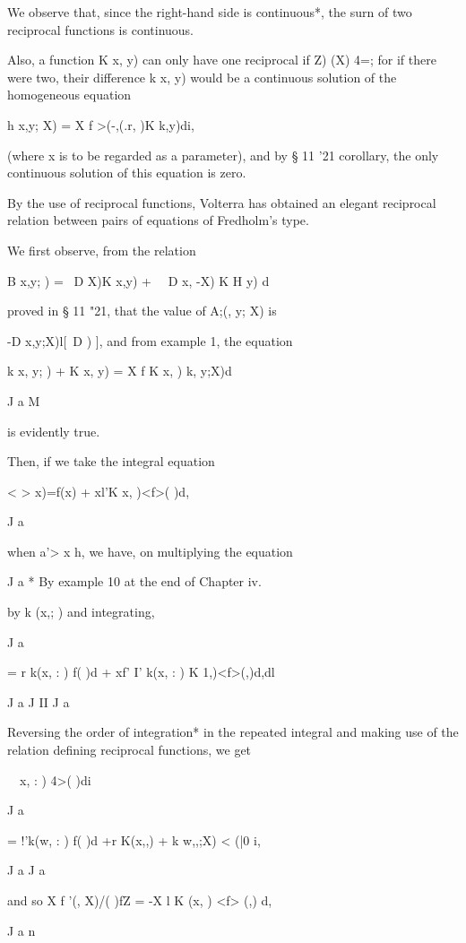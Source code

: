 We observe that, since the right-hand side is continuous*, the surn of
two reciprocal functions is continuous.

Also, a function K x, y) can only have one reciprocal if Z) (X) 4=;
for if there were two, their difference k x, y) would be a continuous
solution of the homogeneous equation

h x,y; X) = X f >(-,(.r, )K k,y)di,

(where x is to be regarded as a parameter), and by § 11 '21 corollary,
the only continuous solution of this equation is zero.

By the use of reciprocal functions, Volterra has obtained an elegant
reciprocal relation between pairs of equations of Fredholm's type.

We first observe, from the relation

B x,y; ) = \ D X)K x,y) + \ \ D x, -X) K H y) d

proved in § 11 "21, that the value of A;(, y; X) is

-D x,y;X)l[\ D ) ], and from example 1, the equation

k x, y; ) + K x, y) = X f K x, ) k, y;X)d

J a M

is evidently true.

Then, if we take the integral equation

< > x)=f(x) + xl'K x, )<f>( )d,

J a

when a'> x h, we have, on multiplying the equation

J a * By example 10 at the end of Chapter iv.

%
%

by k (x,; ) and integrating,

J a

= r k(x, : ) f( )d + xf' I' k(x, : ) K 1,)<f>(,)d,dl

J a J II J a

Reversing the order of integration* in the repeated integral and
making use of the relation defining reciprocal functions, we get

\ \ x, : ) 4>( )di

J a

= !'k(w, : ) f( )d +r K(x,,) + k w,,;X) < (|0 i,

J a J a

and so X f '(, X)/( )fZ = -X l K (x, ) <f> (,) d,

J a n

